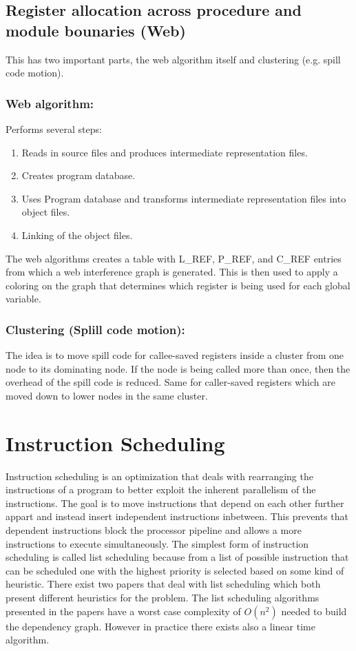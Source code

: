 \documentclass[a4paper,10pt]{article}
\begin{document}
\subsection{Register allocation across procedure and module bounaries (Web)}
This has two important parts, the web algorithm itself and clustering (e.g. spill code motion).
\subsubsection*{Web algorithm:}
Performs several steps:
\begin{enumerate}
 \item Reads in source files and produces intermediate representation files.
 \item Creates program database.
 \item Uses Program database and transforms intermediate representation files into object files.
 \item Linking of the object files.
\end{enumerate}
The web algorithms creates a table with L\_REF, P\_REF, and C\_REF entries from which a web interference graph is generated. This is then
used to apply a coloring on the graph that determines which register is being used for each global variable.

\subsubsection*{Clustering (Splill code motion):}
The idea is to move spill code for callee-saved registers inside a cluster from one node to
its dominating node. If the node is being called more than once, then the overhead of the spill code is reduced. Same for caller-saved
registers which are moved down to lower nodes in the same cluster.

\section{Instruction Scheduling}
Instruction scheduling is an optimization that deals with rearranging the instructions of a program to better exploit the inherent
parallelism of the instructions. The goal is to move instructions that depend on each other further appart and instead insert independent
instructions inbetween. This prevents that dependent instructions block the processor pipeline and allows a more instructions to execute
simultaneously. The simplest form of instruction scheduling is called list scheduling because from a list of possible instruction that
can be scheduled one with the highest priority is selected based on some kind of heuristic. There exist two papers that deal with list
scheduling which both present different heuristics for the problem. The list scheduling algorithms presented in the papers have a worst
case complexity of $O(n^2)$ needed to build the dependency graph. However in practice there exists also a linear time algorithm.
\end{document}
